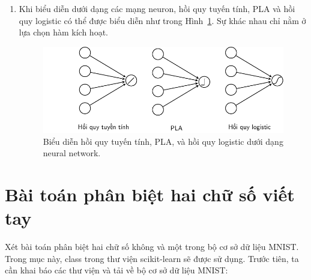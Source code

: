 \begin{enumerate}
     Hàm dự đoán đầu ra của các điểm dữ liệu mới có thể được viết như sau:
\begin{lstlisting}[language=Python]
def predict(w, X, threshold = 0.5):
    """
    predict output for each row of X
    X: a numpy array of shape (N, d), threshold: 0 < threshold < 1
    return a 1d numpy array, each element is 0 or 1
    """
    res = np.zeros(X.shape[0])
    res[np.where(prob(w, X) > threshold)[0]] = 1
    return res 
\end{lstlisting}
    Trong các ví dụ đã nêu, ngưỡng ra quyết định đều được lấy tại 0.5. Trong
    nhiều trường hợp, ngưỡng này có thể được thay đổi. Ví dụ, việc xác định các
    giao dịch là lừa đảo của một công ty tín dụng là rất quan trọng. Việc phân
    loại nhầm một giao dịch lừa đảo thành một giao dịch thông thường gây ra hậu
    quả nghiêm trọng hơn chiều ngược lại. Trong bài toán đó, ngưỡng phân loại có
    thể giảm xuống còn 0.3. Nghĩa là các giao dịch được dự đoán là lừa đảo với
    xác suất lớn hơn 0.3 sẽ được gán nhãn lừa đảo và cần được xử lý bằng các biện pháp khác. 


 
    \item Khi biểu diễn dưới dạng các mạng neuron, hồi quy tuyến tính, PLA và
    hồi quy logistic có thể được biểu diễn như trong Hình~\ref{fig:10_8}. Sự
    khác nhau chỉ nằm ở lựa chọn hàm kích hoạt. 
    \begin{figure}[t]
    \centering
        \includegraphics[width = .9\textwidth]{Chapters/05_NeuralNetworks/10_logisticregression/latex/3models.pdf}
        \caption[]{Biểu diễn hồi quy tuyến tính, PLA, và hồi quy logistic
        dưới dạng neural network.}
        \label{fig:10_8}
    \end{figure}
 
\end{enumerate}










\section{Bài toán phân biệt hai chữ số viết tay }
Xét bài toán phân biệt hai chữ số không và một trong bộ cơ sở dữ liệu MNIST.
Trong mục này, class  trong thư viện
scikit-learn sẽ được sử dụng. Trước tiên, ta cần khai báo các thư viện và tải về
bộ cơ sở dữ liệu MNIST:


